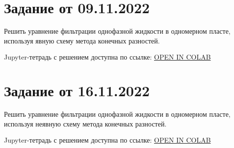 \documentclass[a4paper,12pt]{article}
\begin{document}
\newpage
\section{Задание от 09.11.2022}

Решить уравнение фильтрации однофазной жидкости в одномерном пласте, используя явную схему метода конечных разностей.

Jupyter-тетрадь с решением доступна по ссылке: \href{https://colab.research.google.com/github/mualal/notebooks-source/blob/master/10_one_dimensional_filtration.ipynb}{OPEN IN COLAB}

\newpage
\section{Задание от 16.11.2022}

Решить уравнение фильтрации однофазной жидкости в одномерном пласте, используя неявную схему метода конечных разностей.

Jupyter-тетрадь с решением доступна по ссылке: \href{https://colab.research.google.com/github/mualal/notebooks-source/blob/master/10_one_dimensional_filtration.ipynb}{OPEN IN COLAB}
\end{document}
